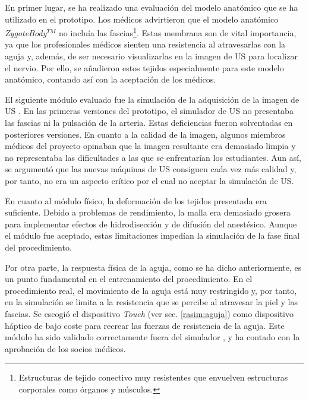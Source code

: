 En primer lugar, se ha realizado una evaluación del modelo anatómico que se ha utilizado en el prototipo. Los médicos advirtieron que el modelo anatómico \emph{ZygoteBody}$^{TM}$ no incluía las fascias\footnote{Estructuras de tejido conectivo muy resistentes que envuelven estructuras corporales como órganos y músculos.}. Estas membrana son de vital importancia, ya que los profesionales médicos sienten una resistencia al atravesarlas con la aguja y, además, de ser necesario visualizarlas en la imagen de \ac{US} para localizar el nervio. Por ello, se añadieron estos tejidos especialmente para este modelo anatómico, contando así con la aceptación de los médicos.

El siguiente módulo evaluado fue la simulación de la adquisición de la imagen de \ac{US} \cite{Law2015}. En las primeras versiones del prototipo, el simulador de \ac{US} no presentaba las fascias ni la pulsación de la arteria. Estas deficiencias fueron solventadas en posteriores versiones. En cuanto a la calidad de la imagen, algunos miembros médicos  del proyecto opinaban que la imagen resultante era demasiado limpia y no representaba las dificultades a las que se enfrentarían los estudiantes. Aun así, se argumentó que las nuevas máquinas de \ac{US} consiguen cada vez más calidad y, por tanto, no era un aspecto crítico por el cual no aceptar la simulación de \ac{US}.

En cuanto al módulo físico, la deformación de los tejidos presentada era suficiente. Debido a problemas de rendimiento, la malla era demasiado grosera para implementar efectos de hidrodisección y de difusión del anestésico. Aunque el módulo fue aceptado, estas limitaciones impedían la simulación de la fase final del procedimiento.

Por otra parte, la respuesta física de la aguja, como se ha dicho anteriormente, es un punto fundamental en el entrenamiento del procedimiento. En el procedimiento real, el movimiento de la aguja está muy restringido y, por tanto, en la simulación se limita a la resistencia que se percibe al atravesar la piel y las fascias. Se escogió el dispositivo \emph{Touch} (ver sec. \ref{rasim:aguja}) como dispositivo háptico de bajo coste para recrear las fuerzas de resistencia de la aguja. Este módulo ha sido validado correctamente fuera del simulador \cite{needleinsertion}, y ha contado con la aprobación de los socios médicos.  %


